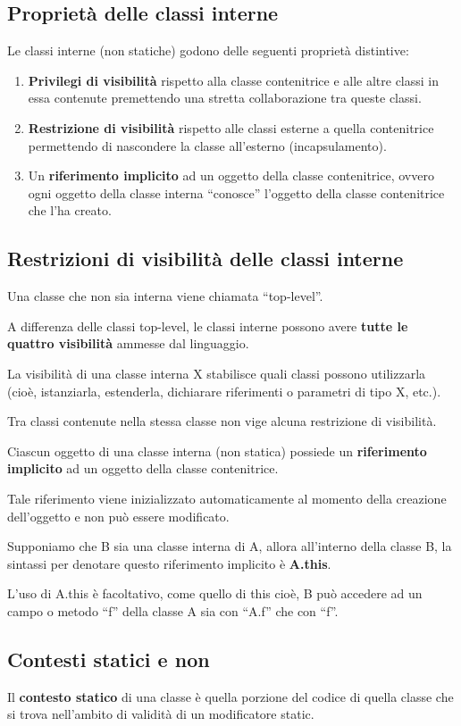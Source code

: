 \documentclass[10pt]{article}
\begin{document}
\subsection{Proprietà delle classi interne}
Le classi interne (non statiche) godono delle seguenti proprietà distintive:
\begin{enumerate}
    \item \textbf{Privilegi di visibilità} rispetto alla classe contenitrice e alle altre classi in essa contenute premettendo una stretta collaborazione tra queste classi.
    \item \textbf{Restrizione di visibilità} rispetto alle classi esterne a quella contenitrice permettendo di nascondere la classe all'esterno (incapsulamento).
    \item Un \textbf{riferimento implicito} ad un oggetto della classe contenitrice, ovvero ogni oggetto della classe interna “conosce” l'oggetto della classe contenitrice che l'ha creato.

\end{enumerate}
\subsection{Restrizioni di visibilità delle classi interne}
Una classe che non sia interna viene chiamata “top-level”.

A differenza delle classi top-level, le classi interne possono avere \textbf{tutte le quattro visibilità}
ammesse dal linguaggio.

La visibilità di una classe interna X stabilisce quali classi possono utilizzarla (cioè, istanziarla, 
estenderla, dichiarare riferimenti o parametri di tipo X, etc.).

Tra classi contenute nella stessa classe non 
vige alcuna restrizione di visibilità.

Ciascun oggetto di una classe interna (non statica) possiede un \textbf{riferimento 
implicito} ad un oggetto della classe contenitrice.

Tale riferimento viene inizializzato automaticamente al momento della creazione dell'oggetto e non può essere modificato.

Supponiamo che B sia una classe interna di A, allora all'interno della classe B, la sintassi per denotare questo riferimento implicito è \textbf{A.this}.

L'uso di A.this è facoltativo, come quello di this cioè, B può accedere ad un campo o metodo “f” della classe A sia con “A.f” che con “f”.
\subsection{Contesti statici e non}
Il \textbf{contesto statico} di una classe è quella porzione del codice di quella classe che si trova nell’ambito 
di validità di un modificatore static.
\end{document}
